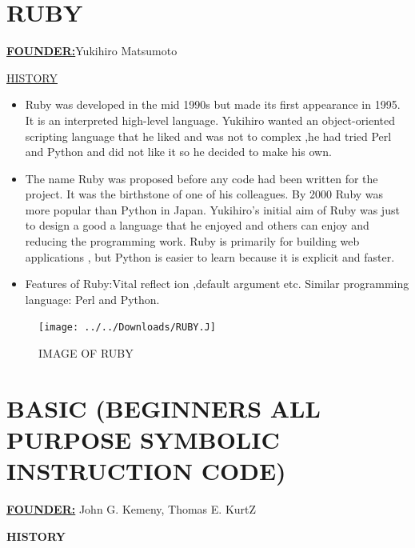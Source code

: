 \documentclass{article}
\begin{document}
	\section{RUBY}
	\textbf{\underline{FOUNDER:}}Yukihiro Matsumoto
	
		\underline{HISTORY}
		
		\begin{itemize}
			\item Ruby was developed in the mid 1990s but made its first appearance in 1995. It is an interpreted high-level language. Yukihiro wanted an object-oriented scripting language that he liked and was not to complex ,he had tried Perl and Python and did not like it so he decided to make his own.
			\item The name Ruby was proposed before any code had been written for the project. It was the birthstone of one of his colleagues. By 2000 Ruby was more popular than Python in Japan. Yukihiro’s initial aim of Ruby was just to design a good a language that he enjoyed and others can enjoy and reducing the programming work. Ruby is primarily for building web applications , but Python is easier to learn because it is explicit and faster.
			
			\item  Features of Ruby:Vital reflect ion ,default argument etc.
			Similar programming language: Perl and Python.
			
			
		\end{itemize}
	\begin{figure}
		\centering
		\texttt{[image: ../../Downloads/RUBY.J]}
		\caption{IMAGE OF RUBY}
		\label{fig:ruby}
	\end{figure}
\section{BASIC (BEGINNERS ALL PURPOSE SYMBOLIC INSTRUCTION CODE)}
\textbf{\underline{FOUNDER:}}
	John G. Kemeny, Thomas E. KurtZ
	
	\textbf{HISTORY}
	
\end{document}

